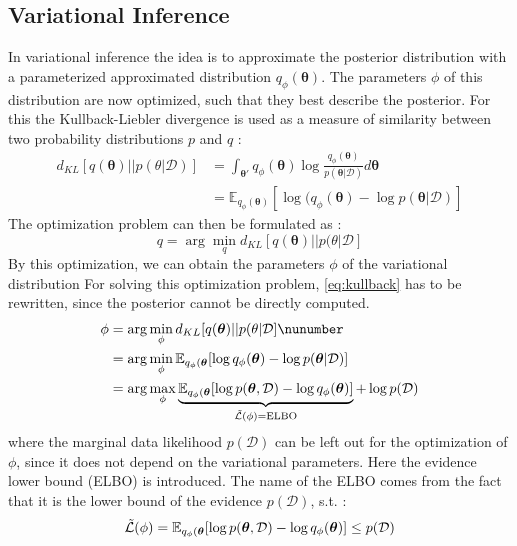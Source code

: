 \documentclass{article}
\begin{document}
\subsection{Variational Inference}
In variational inference the idea is to approximate the posterior distribution with a parameterized approximated distribution $q_\phi (\bm \theta)$. The parameters $\phi$ of this distribution are now optimized, such that they best describe the posterior. For this the Kullback-Liebler divergence is used as a measure of similarity between two probability distributions $p$ and $q$ \cite{murphy, BNNdistill}:
\begin{equation}
\begin{aligned}\label{eq:kullback}
    d_{KL} [q(\bm \theta)|| p(\theta|\mathcal{D})] &= \int_{\bm \theta'} q_\phi(\bm \theta) \log \frac{q_\phi(\bm \theta)}{p(\bm \theta|\mathcal{D})} d\bm \theta\\
    &=\mathbb{E}_{q_\phi(\bm \theta)}[\log(q_\phi(\bm \theta) - \log p(\bm \theta|\mathcal{D})]
\end{aligned}
\end{equation}
The optimization problem can then be formulated as \cite{murphy}:
\begin{equation}\label{eq:optprob}
    q = \arg \min_q d_{KL} [q(\bm \theta)|| p(\theta|\mathcal{D}]
\end{equation}
By this optimization, we can obtain the parameters $\phi$ of the variational distribution
For solving this optimization problem, \eqref{eq:kullback} has to be rewritten, since the posterior cannot be directly computed. 
\begin{align}
    \phi &= \arg \min_\phi d_{KL} [q(\bm \theta)|| p(\theta|\mathcal{D}]\nunumber\\
    &= \arg \min_\phi \mathbb{E}_{q_\phi(\bm \theta}[\log q_\phi(\bm \theta) - \log p(\bm \theta|\mathcal{D})]\nonumber\\
    &= \arg \max_\phi \underbrace{\mathbb{E}_{q_\phi(\bm \theta}[\log p(\bm \theta, \mathcal{D}) - \log q_\phi(\bm \theta)]}_{\Tilde{\mathcal{L}}(\phi) = \text{ELBO}} + \log p(\mathcal{D)}
\end{align}
where the marginal data likelihood $p(\mathcal{D})$ can be left out for the optimization of $\phi$, since it does not depend on the variational parameters. Here the evidence lower bound (ELBO) is introduced. The name of the ELBO comes from the fact that it is the lower bound of the evidence $p(\mathcal{D})$, s.t. \cite{murphy}:
\begin{equation}
    \Tilde{\mathcal{L}}(\phi) = \mathbb{E}_{q_\phi(\bm \theta}[\log p(\bm \theta, \mathcal{D}) - \log q_\phi(\bm \theta)] \leq p(\mathcal{D})
\end{equation}
\end{document}
